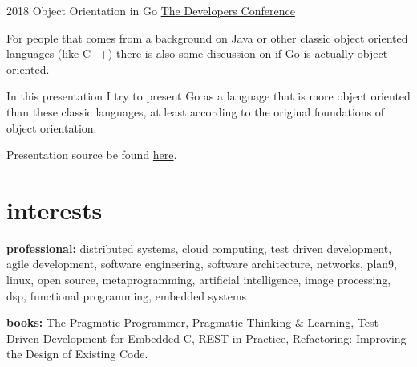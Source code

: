\documentclass[]{friggeri-cv} %
\begin{document}
\begin{entrylist}
\entry
{2018}
{Object Orientation in Go}
{\href{http://www.thedevelopersconference.com.br/tdc/2018/florianopolis/trilha-golang}{The Developers Conference}}
{

For people that comes from a background on Java or other classic object oriented languages
(like C++) there is also some discussion on if Go is actually object oriented.

In this presentation I try to present Go as a language that is more object oriented than these
classic languages, at least according to the original foundations of object orientation.

Presentation source be found \href{https://github.com/katcipis/my.presentations/blob/master/gooo/gooo.slide}{here}.

}
\end{entrylist}


\section{interests}

\textbf{professional:} distributed systems, cloud computing, test driven development, agile development, software engineering, software architecture, networks, plan9, linux, open source, metaprogramming, artificial intelligence, image processing, dsp, functional programming, embedded systems

\textbf{books:} The Pragmatic Programmer, Pragmatic Thinking \& Learning, Test Driven Development for Embedded C, REST in Practice, Refactoring: Improving the Design of Existing Code.
\end{document}
